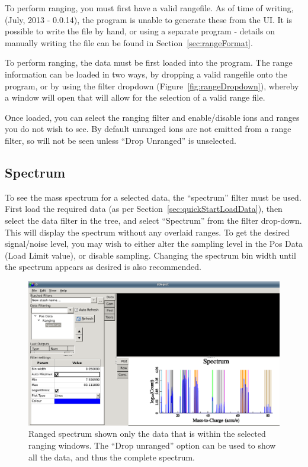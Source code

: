 \documentclass[10pt]{article}
\begin{document}
To perform ranging, you must first have a valid rangefile. As of time of writing, (July, 2013 - 0.0.14), the program is unable to generate these from the UI. It is possible to write the file by hand, or using a separate program - details on manually writing the file can be found in Section~\ref{sec:rangeFormat}.

To perform ranging, the data must be first loaded into the program. The range information can be loaded in two ways, by dropping a valid rangefile onto the program, or by using the filter dropdown (Figure~\ref{fig:rangeDropdown}), whereby a window will open that will allow for the selection of a valid range file. 

Once loaded, you can select the ranging filter and enable/disable ions and ranges you do not wish to see. By default unranged ions are not emitted from a range filter, so will not be seen unless ``Drop Unranged'' is unselected.


\subsection{Spectrum}
To see the mass spectrum for a selected data, the ``spectrum'' filter must be used. First load the required data (as per Section~\ref{sec:quickStartLoadData}), then select the data filter in the tree, and select ``Spectrum'' from the filter drop-down. This will display the spectrum without any overlaid ranges. To get the desired signal/noise level, you may wish to either alter the sampling level in the Pos Data (Load Limit value), or disable sampling. Changing the spectrum bin width until the spectrum appears as desired is also recommended.

\begin{figure}[h]
\centering
 \includegraphics[width=0.85 \textwidth,keepaspectratio=true]{./figures/rangedSpectrum.png}

 \caption{Ranged spectrum shown only the data that is within the selected ranging windows. The ``Drop unranged'' option can be used to show all the data, and thus the complete spectrum.}
\label{fig:rangedSpectrum}
\end{figure}
\end{document}
